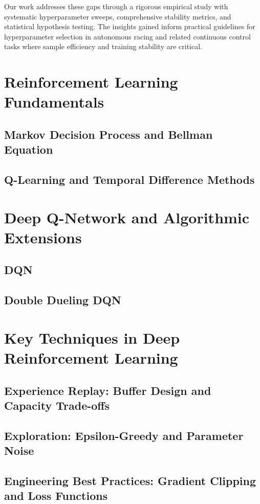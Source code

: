Our work addresses these gaps through a rigorous empirical study with systematic hyperparameter sweeps, comprehensive stability metrics, and statistical hypothesis testing. The insights gained inform practical guidelines for hyperparameter selection in autonomous racing and related continuous control tasks where sample efficiency and training stability are critical.








\section{Reinforcement Learning Fundamentals}
\subsection{Markov Decision Process and Bellman Equation}
\subsection{Q-Learning and Temporal Difference Methods}

\section{Deep Q-Network and Algorithmic Extensions}
\subsection{DQN}
\subsection{Double Dueling DQN}

\section{Key Techniques in Deep Reinforcement Learning}
\subsection{Experience Replay: Buffer Design and Capacity Trade-offs}
\subsection{Exploration: Epsilon-Greedy and Parameter Noise}
\subsection{Engineering Best Practices: Gradient Clipping and Loss Functions}

